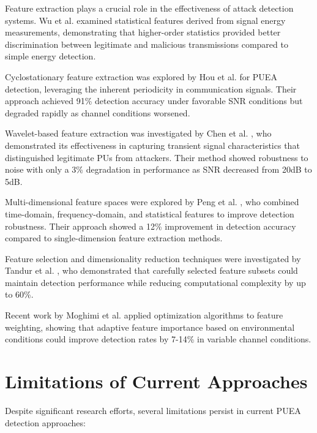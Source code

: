 Feature extraction plays a crucial role in the effectiveness of attack detection systems. Wu et al. \cite{wu2014feature} examined statistical features derived from signal energy measurements, demonstrating that higher-order statistics provided better discrimination between legitimate and malicious transmissions compared to simple energy detection.

Cyclostationary feature extraction was explored by Hou et al. \cite{hou2015cyclostationary} for PUEA detection, leveraging the inherent periodicity in communication signals. Their approach achieved 91\% detection accuracy under favorable SNR conditions but degraded rapidly as channel conditions worsened.

Wavelet-based feature extraction was investigated by Chen et al. \cite{chen2017wavelet}, who demonstrated its effectiveness in capturing transient signal characteristics that distinguished legitimate PUs from attackers. Their method showed robustness to noise with only a 3\% degradation in performance as SNR decreased from 20dB to 5dB.

Multi-dimensional feature spaces were explored by Peng et al. \cite{peng2018multidimensional}, who combined time-domain, frequency-domain, and statistical features to improve detection robustness. Their approach showed a 12\% improvement in detection accuracy compared to single-dimension feature extraction methods.

Feature selection and dimensionality reduction techniques were investigated by Tandur et al. \cite{tandur2016feature}, who demonstrated that carefully selected feature subsets could maintain detection performance while reducing computational complexity by up to 60\%.

Recent work by Moghimi et al. \cite{moghimi2020optimization} applied optimization algorithms to feature weighting, showing that adaptive feature importance based on environmental conditions could improve detection rates by 7-14\% in variable channel conditions.

\section{Limitations of Current Approaches}

Despite significant research efforts, several limitations persist in current PUEA detection approaches:

